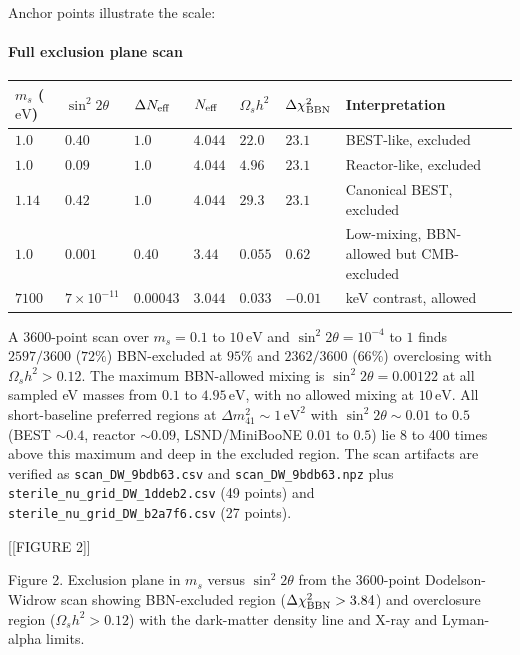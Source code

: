 \documentclass[11pt,a4paper]{article}
\begin{document}
Anchor points illustrate the scale:

\paragraph{Full exclusion plane scan}
\begin{longtable}{@{}p{}p{}p{}p{}p{}p{}p{}@{}}
\toprule
\textbf{$m_s$ ($\mathrm{eV}$)} & \textbf{$\sin^2 2\theta$} & \textbf{$\Delta N_{\rm eff}$} & \textbf{$N_{\rm eff}$} & \textbf{$\Omega_s h^2$} & \textbf{$\Delta\chi^2_{\rm BBN}$} & \textbf{Interpretation} \\ \midrule \endhead
$1.0$ & $0.40$ & $1.0$ & $4.044$ & $22.0$ & $23.1$ & BEST-like, excluded \\
$1.0$ & $0.09$ & $1.0$ & $4.044$ & $4.96$ & $23.1$ & Reactor-like, excluded \\
$1.14$ & $0.42$ & $1.0$ & $4.044$ & $29.3$ & $23.1$ & Canonical BEST, excluded \\
$1.0$ & $0.001$ & $0.40$ & $3.44$ & $0.055$ & $0.62$ & Low-mixing, BBN-allowed but CMB-excluded \\
$7100$ & $7\times10^{-11}$ & $0.00043$ & $3.044$ & $0.033$ & $-0.01$ & keV contrast, allowed \\
\bottomrule\end{longtable}
A 3600-point scan over $m_s = 0.1$ to $10\,\mathrm{eV}$ and $\sin^2 2\theta = 10^{-4}$ to $1$ finds $2597/3600$ ($72\%$) BBN-excluded at $95\%$ and $2362/3600$ ($66\%$) overclosing with $\Omega_s h^2 > 0.12$. The maximum BBN-allowed mixing is $\sin^2 2\theta = 0.00122$ at all sampled eV masses from $0.1$ to $4.95\,\mathrm{eV}$, with no allowed mixing at $10\,\mathrm{eV}$. All short-baseline preferred regions at $\Delta m^2_{41} \sim 1\,\mathrm{eV}^2$ with $\sin^2 2\theta \sim 0.01$ to $0.5$ (BEST $\sim 0.4$, reactor $\sim 0.09$, LSND/MiniBooNE $0.01$ to $0.5$) lie 8 to 400 times above this maximum and deep in the excluded region. The scan artifacts are verified as \texttt{scan\_\allowbreak{}DW\_\allowbreak{}9bdb63.csv} and \texttt{scan\_\allowbreak{}DW\_\allowbreak{}9bdb63.npz} plus \texttt{sterile\_\allowbreak{}nu\_\allowbreak{}grid\_\allowbreak{}DW\_\allowbreak{}1ddeb2.csv} (49 points) and \texttt{sterile\_\allowbreak{}nu\_\allowbreak{}grid\_\allowbreak{}DW\_\allowbreak{}b2a7f6.csv} (27 points).


[[FIGURE 2]]

Figure 2. Exclusion plane in $m_s$ versus $\sin^2 2\theta$ from the 3600-point Dodelson-Widrow scan showing BBN-excluded region ($\Delta\chi^2_{\rm BBN} > 3.84$) and overclosure region ($\Omega_s h^2 > 0.12$) with the dark-matter density line and X-ray and Lyman-alpha limits.
\end{document}
